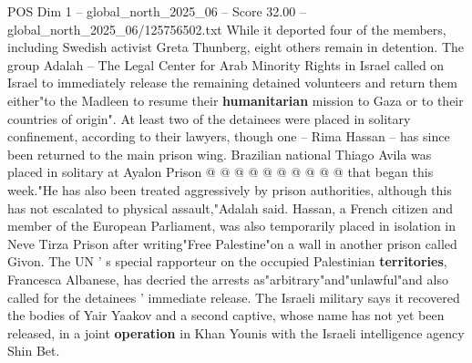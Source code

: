 \begin{textsample}{POS Dim 1 – global\_north\_2025\_06 – Score 32.00 – global\_north\_2025\_06/125756502.txt}
While it deported four of the members, including Swedish activist Greta Thunberg, eight others remain in detention.
The group Adalah -- The Legal Center for Arab Minority Rights in Israel called on Israel to immediately release the remaining detained volunteers and return them either"to the Madleen to resume their \textbf{humanitarian} mission to Gaza or to their countries of origin".
At least two of the detainees were placed in solitary confinement, according to their lawyers, though one -- Rima Hassan -- has since been returned to the main prison wing.
Brazilian national Thiago Avila was placed in solitary at Ayalon Prison @ @ @ @ @ @ @ @ @ @ that began this week."He has also been treated aggressively by prison authorities, although this has not escalated to physical assault,"Adalah said.
Hassan, a French citizen and member of the European Parliament, was also temporarily placed in isolation in Neve Tirza Prison after writing"Free Palestine"on a wall in another prison called Givon.
The UN ' s special rapporteur on the occupied Palestinian \textbf{territories}, Francesca Albanese, has decried the arrests as"arbitrary"and"unlawful"and also called for the detainees ' immediate release.
The Israeli military says it recovered the bodies of Yair Yaakov and a second captive, whose name has not yet been released, in a joint \textbf{operation} in Khan Younis with the Israeli intelligence agency Shin Bet.

\end{textsample}
